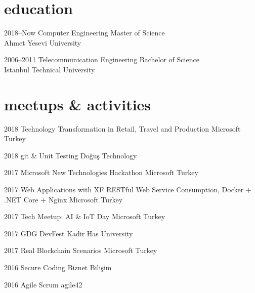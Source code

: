 \documentclass[]{../friggeri-cv} %
\begin{document}
\section{education}

\begin{entrylist}

\entry
{2018--Now}
{Computer Engineering}
{}
{Master of Science
\\Ahmet Yesevi University}
	
\entry
{2006--2011}
{Telecommunication Engineering}
{}
{Bachelor of Science
\\Istanbul Technical University}
	
\end{entrylist}

\section{meetups \& activities}

\begin{entrylist}

\entry
{2018}
{Technology Transformation in Retail, Travel and Production}
{}
{Microsoft Turkey}

\entry
{2018}
{git \& Unit Testing}
{}
{Doğuş Technology}

\entry
{2017}
{Microsoft New Technologies Hackathon}
{}
{Microsoft Turkey}

\entry
{2017}
{Web Applications with XF RESTful Web Service Consumption, Docker + .NET Core + Nginx}
{}
{Microsoft Turkey}

\entry
{2017}
{Tech Meetup: AI \& IoT Day}
{}
{Microsoft Turkey}

\entry
{2017}
{GDG DevFest}
{}
{Kadir Has University}

\entry
{2017}
{Real Blockchain Scenarios}
{}
{Microsoft Turkey}

\entry
{2016}
{Secure Coding}
{}
{Biznet Bilişim}

\entry
{2016}
{Agile Scrum}
{}
{agile42}

\end{entrylist}
\end{document}
